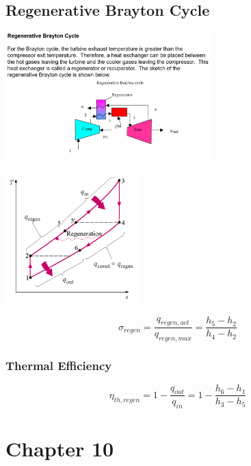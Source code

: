 \documentclass[10pt,landscape]{article}
\newenvironment{Figure}
     {\par\medskip\noindent\minipage{\linewidth}}
     {\endminipage\par\medskip}
\begin{document}
\begin{multicols}{3}
\subsection{Regenerative Brayton Cycle}
\begin{Figure}
    \centering
    \includegraphics[width=\linewidth, height=5cm]{RegenerativeBrayton.png}
\end{Figure}
\begin{Figure}
    \centering
    \includegraphics[width=\linewidth, height=5cm]{BraytonRegenerative_TS_Diagram.png}
\end{Figure}
\begin{equation}
    \sigma_{regen}=\frac{q_{regen,act}}{q_{regen,max}}=\frac{h_5-h_2}{h_4-h_2}
\end{equation}
\subsubsection{Thermal Efficiency}
\begin{equation}
    \eta_{th,regen}=1-\frac{q_{out}}{q_{in}}=1-\frac{h_6-h_1}{h_3-h_5}
\end{equation}

\section{Chapter 10}

\end{multicols}
\end{document}
